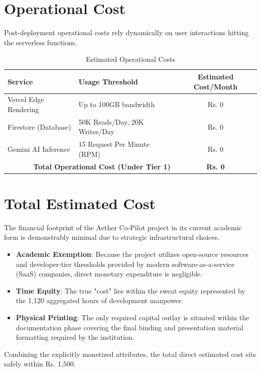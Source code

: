 \section{Operational Cost}
Post-deployment operational costs rely dynamically on user interactions hitting the serverless functions.
\begin{table}[h!]
\centering
\begin{tabular}{|l|p{5cm}|c|}
\hline
\textbf{Service} & \textbf{Usage Threshold} & \textbf{Estimated Cost/Month} \\ \hline
Vercel Edge Rendering & Up to 100GB bandwidth & Rs. 0 \\ \hline
Firestore (Database) & 50K Reads/Day, 20K Writes/Day & Rs. 0 \\ \hline
Gemini AI Inference & 15 Request Per Minute (RPM) & Rs. 0 \\ \hline
\multicolumn{2}{|r|}{\textbf{Total Operational Cost (Under Tier 1)}} & \textbf{Rs. 0} \\ \hline
\end{tabular}
\caption{Estimated Operational Costs}
\end{table}

\section{Total Estimated Cost}
The financial footprint of the Aether Co-Pilot project in its current academic form is demonstrably minimal due to strategic infrastructural choices.
\begin{itemize}
    \item \textbf{Academic Exemption}: Because the project utilizes open-source resources and developer-tier thresholds provided by modern software-as-a-service (SaaS) companies, direct monetary expenditure is negligible.
    \item \textbf{Time Equity}: The true "cost" lies within the sweat equity represented by the 1,120 aggregated hours of development manpower.
    \item \textbf{Physical Printing}: The only required capital outlay is situated within the documentation phase covering the final binding and presentation material formatting required by the institution.
\end{itemize}
Combining the explicitly monetized attributes, the total direct estimated cost sits safely within Rs. 1,500.

